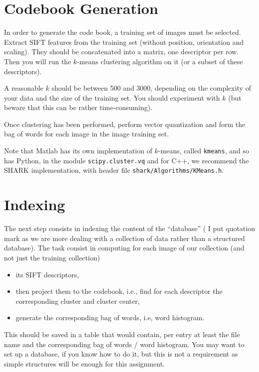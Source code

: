 \documentclass[a4paper,12pts]{article}
\begin{document}
\section{Codebook Generation}

In order to generate the code book, a training set of images must be
selected. Extract SIFT features from the training set (without
position, orientation and scaling). They should be concatenated into a
matrix, one descriptor per row. Then you will run the $k$-means
clustering algorithm on it (or a subset of these descriptors).

A reasonable $k$ should be between 500 and 3000, depending on the
complexity of your data and the size of the training set.  You should
experiment with $k$ (but beware that this can be rather
time-consuming).

Once clustering has been performed, perform vector quantization and
form the bag of words for each image in the image training set.

Note that Matlab has its own implementation of $k$-means, called \texttt{kmeans}, and so has Python,
in the module \texttt{scipy.cluster.vq} and for C++, we recommend the SHARK
implementation, with header file \texttt{shark/Algorithms/KMeans.h}.


\section{Indexing}

The next step consists in indexing the content of the ``database'' ( I
put quotation mark as we are more dealing with a collection of data
rather than a structured database). The task consist in computing for
each image of our collection (and not just the training collection)
\begin{itemize}
\item its SIFT descriptors,
\item then project them to the codebook, i.e., find for each
  descriptor the corresponding cluster and cluster center,
\item generate the corresponding bag of words, i.e, word histogram.
\end{itemize}

This should be saved in a table that would contain, per entry at least
the file name and the corresponding bag of words / word histogram.
You may want to set up a database, if you know how to do it, but this
is not a requirement as simple structures will be enough for this
assignment.
\end{document}
